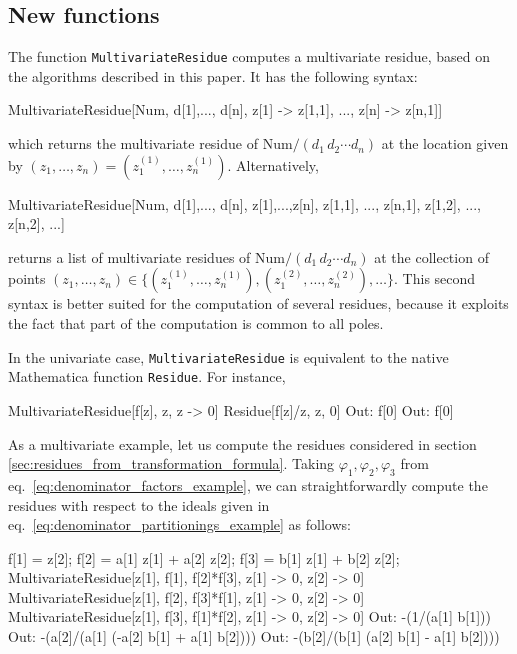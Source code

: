 \documentclass[dvipsnames,preprint,12pt,sort&compress]{elsarticle}
\newcommand{\Math}[1]
{\lstinline[style=Mathematica,breaklines=false,basicstyle=\small \ttfamily\null]~#1~}
\begin{document}
\subsection{New functions}
\label{sec:newfunction}

The function \Math{MultivariateResidue} computes a multivariate residue, based on the algorithms described in this paper.
It has the following syntax:
\begin{CodeSample}
MultivariateResidue[Num, {d[1],..., d[n]},
					   {z[1] -> z[1,1], ..., z[n] -> z[n,1]}]
\end{CodeSample}
which returns the multivariate residue of $\mathrm{Num} / (d_1\,d_2 \dotsm d_n)$ at the location given by $(z_1,\dotsc,z_n) = (z_1^{(1)},\dotsc,z_n^{(1)})$.
Alternatively,
\begin{CodeSample}
MultivariateResidue[Num, {d[1],..., d[n]}, {z[1],...,z[n]},
				 {{z[1,1], ..., z[n,1]}, {z[1,2], ..., z[n,2]}, ...}]
\end{CodeSample}
returns a list of multivariate residues of $\mathrm{Num} / (d_1\,d_2 \dotsm d_n)$ at the collection of points $(z_1,\dotsc,z_n) \in \{ (z_1^{(1)},\dotsc,z_n^{(1)}), (z_1^{(2)},\dotsc,z_n^{(2)}), \dotsc \}$.
This second syntax is better suited for the computation of several residues, because it exploits the fact that part of the computation is common to all poles.

In the univariate case, \Math{MultivariateResidue} is equivalent to the native Mathematica function \Math{Residue}. For instance,
\begin{CodeSample}
MultivariateResidue[f[z], {z}, {z -> 0}]
Residue[f[z]/z, {z, 0}]
Out: f[0]
Out: f[0]
\end{CodeSample}

As a multivariate example, let us compute the residues considered in section \ref{sec:residues_from_transformation_formula}.
Taking $\varphi_1, \varphi_2, \varphi_3$ from eq.~\eqref{eq:denominator_factors_example}, we can straightforwardly compute the residues with respect to the ideals given in eq.~\eqref{eq:denominator_partitionings_example} as follows:
\begin{CodeSample}
f[1] = z[2];
f[2] = a[1] z[1] + a[2] z[2];
f[3] = b[1] z[1] + b[2] z[2];
MultivariateResidue[z[1], {f[1], f[2]*f[3]}, {z[1] -> 0, z[2] -> 0}]
MultivariateResidue[z[1], {f[2], f[3]*f[1]}, {z[1] -> 0, z[2] -> 0}]
MultivariateResidue[z[1], {f[3], f[1]*f[2]}, {z[1] -> 0, z[2] -> 0}]
Out: -(1/(a[1] b[1]))
Out: -(a[2]/(a[1] (-a[2] b[1] + a[1] b[2])))
Out: -(b[2]/(b[1] (a[2] b[1] - a[1] b[2])))
\end{CodeSample}
\end{document}
